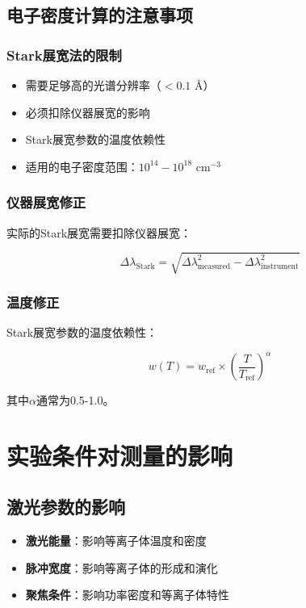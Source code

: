 \documentclass[12pt,a4paper]{article}
\begin{document}
\subsection{电子密度计算的注意事项}

\subsubsection{Stark展宽法的限制}
\begin{itemize}
    \item 需要足够高的光谱分辨率（$< 0.1$ Å）
    \item 必须扣除仪器展宽的影响
    \item Stark展宽参数的温度依赖性
    \item 适用的电子密度范围：$10^{14} - 10^{18}$ cm$^{-3}$
\end{itemize}

\subsubsection{仪器展宽修正}

实际的Stark展宽需要扣除仪器展宽：

\begin{equation}
\boxed{\Delta\lambda_{\text{Stark}} = \sqrt{\Delta\lambda_{\text{measured}}^2 - \Delta\lambda_{\text{instrument}}^2}}
\end{equation}

\subsubsection{温度修正}

Stark展宽参数的温度依赖性：

\begin{equation}
\boxed{w(T) = w_{\text{ref}} \times \left(\frac{T}{T_{\text{ref}}}\right)^\alpha}
\end{equation}

其中$\alpha$通常为0.5-1.0。

\section{实验条件对测量的影响}

\subsection{激光参数的影响}

\begin{itemize}
    \item \textbf{激光能量}：影响等离子体温度和密度
    \item \textbf{脉冲宽度}：影响等离子体的形成和演化
    \item \textbf{聚焦条件}：影响功率密度和等离子体特性
\end{itemize}
\end{document}
